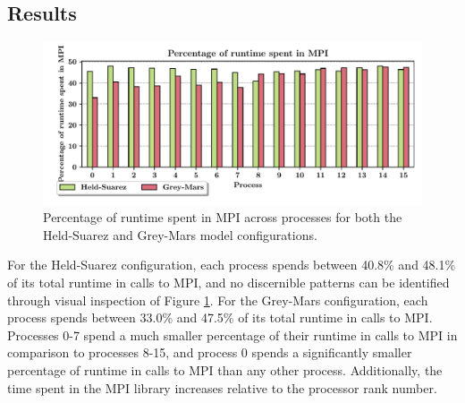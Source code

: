 \documentclass[a4paper,11pt]{report}
\begin{document}
\subsection{Results}
\begin{figure}[htbp]
\begin{center}
	\includegraphics[width=\textwidth]{img/mpi-barrier-time.pdf}
\caption[Percentage of runtime spent in MPI across processes]{Percentage of runtime spent in MPI across processes for both the Held-Suarez and Grey-Mars model configurations.}
\label{fig:mpi-barrier}
\end{center}
\end{figure}
For the Held-Suarez configuration, each process spends between 40.8\% and 48.1\% of its total runtime in calls to MPI, and no discernible patterns can be identified through visual inspection of Figure \ref{fig:mpi-barrier}. For the Grey-Mars configuration, each process spends between 33.0\% and 47.5\% of its total runtime in calls to MPI. Processes 0-7 spend a much smaller percentage of their runtime in calls to MPI in comparison to processes 8-15, and process 0 spends a significantly smaller percentage of runtime in calls to MPI than any other process. Additionally, the time spent in the MPI library increases relative to the processor rank number. 
\par
\end{document}
